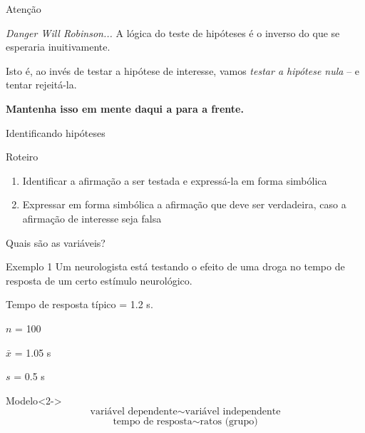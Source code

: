\documentclass{beamer}
\begin{document}
\begin{frame}{\scriptsize Atenção}
  \begin{block}{{\em Danger Will Robinson...}}
    \footnotesize
    A lógica do teste de hipóteses é o \alert{inverso} do que se esperaria inuitivamente.

    \bigskip
    Isto é, ao invés de testar a hipótese de interesse, vamos {\em testar a hipótese nula} -- e tentar rejeitá-la.
  \end{block}

  \hfill
  \begin{center}
    {\bf Mantenha isso em mente daqui a para a frente.}
  \end{center}
\end{frame}

\begin{frame}{\scriptsize Identificando hipóteses}
  \begin{block}{Roteiro}
    \begin{enumerate}
      \footnotesize
    \item Identificar a afirmação a ser testada e expressá-la em forma simbólica
    \bigskip
    \item Expressar em forma simbólica a afirmação que deve ser
      verdadeira, caso a afirmação de interesse seja falsa
    \end{enumerate}
  \end{block}
\end{frame}

\begin{frame}{\scriptsize Quais são as variáveis?}
  \begin{exampleblock}{Exemplo 1}
    \tiny
    Um neurologista está testando o efeito de uma droga no tempo de
    resposta de um certo estímulo neurológico.

    \smallskip
    Tempo de resposta típico = \alert{1.2 s}.

    \smallskip
    $n$ = \alert{100}

    $\bar{x}$ = \alert{1.05 s}

    $s$ = \alert{0.5 s}
  \end{exampleblock}
  \begin{block}{Modelo}<2->
    \footnotesize
    \begin{displaymath}
      \text{variável dependente} \sim \text{variável independente}
    \end{displaymath}
    \alert{
    \begin{displaymath}
      \text{tempo de resposta} \sim \text{ratos (grupo)}
    \end{displaymath}
    }
  \end{block}
\end{frame}
\end{document}
